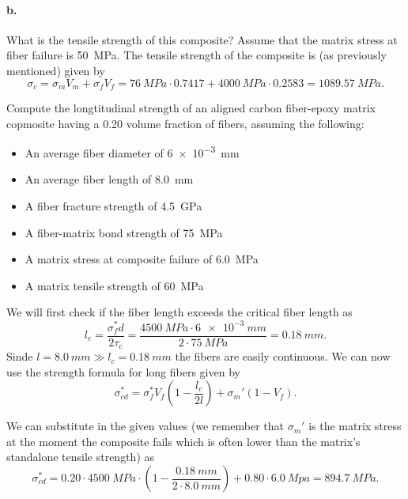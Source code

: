 \paragraph{b.} What is the tensile strength of this composite? Assume that the matrix stress at fiber failure is \qty{50}{MPa}.
\bigbreak
The tensile strength of the composite is (as previously mentioned) given by
\[ 
\sigma_c = \sigma_m V_m + \sigma_f V_f = \qty{76}{MPa} \cdot \num{0,7417} + \qty{4000}{MPa} \cdot \num{0,2583} = \qty{1089,57}{MPa} 
.\]


 Compute the longtitudinal strength of an aligned carbon fiber-epoxy matrix copmosite having a \num{0,20} volume fraction of fibers, assuming the following:
\begin{itemize}
  \item An average fiber diameter of \qty{6e-3}{mm}
  \item An average fiber length of \qty{8,0}{mm}
  \item A fiber fracture strength of \qty{4,5}{GPa} 
  \item A fiber-matrix bond strength of \qty{75}{MPa}
  \item A matrix stress at composite failure of \qty{6,0}{MPa}
  \item A matrix tensile strength of \qty{60}{MPa} 
\end{itemize}
\bigbreak
We will first check if the fiber length exceeds the critical fiber length as
\[ 
l_c = \frac{\sigma_f^{*} d}{2 \tau_c} = \frac{\qty{4500}{MPa} \cdot \qty{6e-3}{mm}}{2 \cdot \qty{75}{MPa}} = \qty{0,18}{mm} 
.\]
Sinde $l = \qty{8,0}{mm} \gg l_c = \qty{0,18}{mm}$ the fibers are easily continuous. We can now use the strength formula for long fibers given by
\[ 
\sigma_{cd}^{*} = \sigma_f^{*}V_f \left( 1 - \frac{l_c}{2l} \right) + \sigma_m' \left( 1 - V_f \right)
.\]

We can substitute in the given values (we remember that $\sigma_m'$ is the matrix stress at the moment the composite fails which is often lower than the matrix’s standalone tensile strength) as
\[ 
\sigma_{cd}^{*} = \num{0,20} \cdot \qty{4500}{MPa} \cdot \left( 1 - \frac{\qty{0,18}{mm}}{2 \cdot \qty{8,0}{mm}} \right) + \num{0,80} \cdot  \qty{6,0}{Mpa} = \qty{894,7}{MPa} 
.\]

